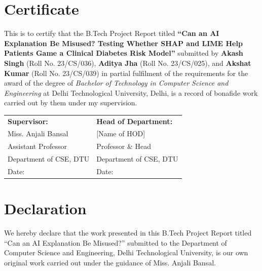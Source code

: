 \documentclass[12pt, a4paper, oneside]{report}
\theoremstyle{definition}
\begin{document}
\chapter*{Certificate}

This is to certify that the B.Tech Project Report titled
\textbf{``Can an AI Explanation Be Misused? Testing Whether SHAP and LIME
Help Patients Game a Clinical Diabetes Risk Model''} submitted by
\textbf{Akash Singh} (Roll No. 23/CS/036),
\textbf{Aditya Jha} (Roll No. 23/CS/025), and
\textbf{Akshat Kumar} (Roll No. 23/CS/039)
in partial fulfilment of the requirements for the award of the degree of
\emph{Bachelor of Technology in Computer Science and Engineering}
at Delhi Technological University, Delhi, is a record of bonafide work
carried out by them under my supervision.

\vspace{2cm}

\noindent
\begin{tabular}{p{7cm}p{7cm}}
  \textbf{Supervisor:}                   & \textbf{Head of Department:} \\[1.5cm]
  Miss. Anjali Bansal                    & [Name of HOD] \\
  Assistant Professor                    & Professor \& Head \\
  Department of CSE, DTU                 & Department of CSE, DTU \\
  Date: \underline{\hspace{3cm}}         & Date: \underline{\hspace{3cm}} \\
\end{tabular}

\chapter*{Declaration}

We hereby declare that the work presented in this B.Tech Project Report
titled ``Can an AI Explanation Be Misused?'' submitted to the Department
of Computer Science and Engineering, Delhi Technological University,
is our own original work carried out under the guidance of Miss. Anjali Bansal.
\end{document}
